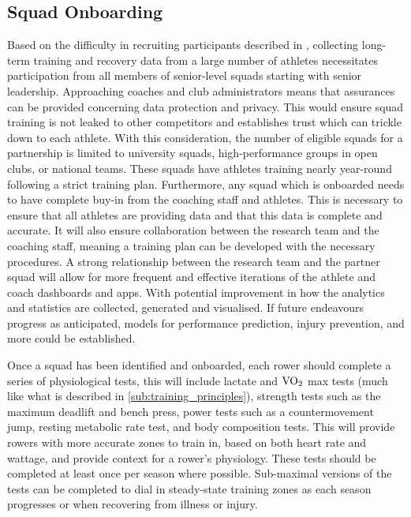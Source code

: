 \subsection{\label{sub:ideal-onboard}Squad Onboarding}
Based on the difficulty in recruiting participants described in , collecting long-term training and recovery data from a large number of athletes necessitates participation from all members of senior-level squads starting with senior leadership. Approaching coaches and club administrators means that assurances can be provided concerning data protection and privacy. This would ensure squad training is not leaked to other competitors and establishes trust which can trickle down to each athlete. With this consideration, the number of eligible squads for a partnership is limited to university squads, high-performance groups in open clubs, or national teams. These squads have athletes training nearly year-round following a strict training plan. Furthermore, any squad which is onboarded needs to have complete buy-in from the coaching staff and athletes. This is necessary to ensure that all athletes are providing data and that this data is complete and accurate. It will also ensure collaboration between the research team and the coaching staff, meaning a training plan can be developed with the necessary procedures. A strong relationship between the research team and the partner squad will allow for more frequent and effective iterations of the athlete and coach dashboards and apps. With potential improvement in how the analytics and statistics are collected, generated and visualised. If future endeavours progress as anticipated, models for performance prediction, injury prevention, and more could be established.

Once a squad has been identified and onboarded, each rower should complete a series of physiological tests, this will include lactate and $\textnormal{VO}_2$ max tests (much like what is described in \autoref{sub:training_principles}), strength tests such as the maximum deadlift and bench press, power tests such as a countermovement jump, resting metabolic rate test, and body composition tests. This will provide rowers with more accurate zones to train in, based on both heart rate and wattage, and provide context for a rower's physiology. These tests should be completed at least once per season where possible. Sub-maximal versions of the tests can be completed to dial in steady-state training zones as each season progresses or when recovering from illness or injury.

